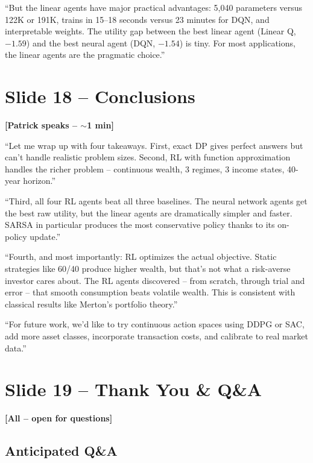 \documentclass[11pt, letterpaper]{article}
\begin{document}
``But the linear agents have major practical advantages: 5,040 parameters versus 122K or 191K, trains in 15--18 seconds versus 23 minutes for DQN, and interpretable weights. The utility gap between the best linear agent (Linear Q, $-1.59$) and the best neural agent (DQN, $-1.54$) is tiny. For most applications, the linear agents are the pragmatic choice.''

\section{Slide 18 -- Conclusions}

\textbf{[Patrick speaks -- $\sim$1 min]}

``Let me wrap up with four takeaways. First, exact DP gives perfect answers but can't handle realistic problem sizes. Second, RL with function approximation handles the richer problem -- continuous wealth, 3 regimes, 3 income states, 40-year horizon.''

``Third, all four RL agents beat all three baselines. The neural network agents get the best raw utility, but the linear agents are dramatically simpler and faster. SARSA in particular produces the most conservative policy thanks to its on-policy update.''

``Fourth, and most importantly: RL optimizes the actual objective. Static strategies like 60/40 produce higher wealth, but that's not what a risk-averse investor cares about. The RL agents discovered -- from scratch, through trial and error -- that smooth consumption beats volatile wealth. This is consistent with classical results like Merton's portfolio theory.''

``For future work, we'd like to try continuous action spaces using DDPG or SAC, add more asset classes, incorporate transaction costs, and calibrate to real market data.''

\section{Slide 19 -- Thank You \& Q\&A}

\textbf{[All -- open for questions]}

\subsection*{Anticipated Q\&A}
\end{document}

